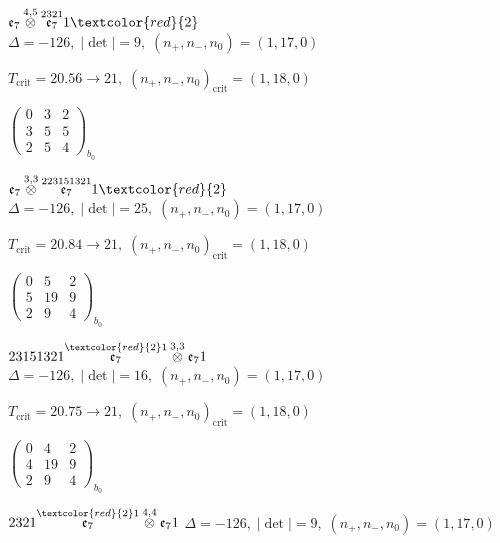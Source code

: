\documentclass[10pt]{article}
\begin{document}
$\mathfrak{e}_7\overset{4,5}{\otimes}\overset{2321}{\mathfrak{e}_7}1\textcolor{red}{2}$ \quad $\Delta=-126,\; |\det|=9,\; (n_+,n_-,n_0)=(1,17,0)$

\hspace{1em}$T_{\text{crit}}=20.56 \to 21,\; (n_+,n_-,n_0)_{\text{crit}}=(1,18,0)$

\hspace{2em}$\left(\begin{smallmatrix}0 & 3 & 2 \\ 3 & 5 & 5 \\ 2 & 5 & 4\end{smallmatrix}\right)_{\!b_0}$

\smallskip

$\mathfrak{e}_7\overset{3,3}{\otimes}\overset{223151321}{\mathfrak{e}_7}1\textcolor{red}{2}$ \quad $\Delta=-126,\; |\det|=25,\; (n_+,n_-,n_0)=(1,17,0)$

\hspace{1em}$T_{\text{crit}}=20.84 \to 21,\; (n_+,n_-,n_0)_{\text{crit}}=(1,18,0)$

\hspace{2em}$\left(\begin{smallmatrix}0 & 5 & 2 \\ 5 & 19 & 9 \\ 2 & 9 & 4\end{smallmatrix}\right)_{\!b_0}$

\smallskip

$23151321\overset{\textcolor{red}{2}1}{\mathfrak{e}_7}\overset{3,3}{\otimes}\mathfrak{e}_71$ \quad $\Delta=-126,\; |\det|=16,\; (n_+,n_-,n_0)=(1,17,0)$

\hspace{1em}$T_{\text{crit}}=20.75 \to 21,\; (n_+,n_-,n_0)_{\text{crit}}=(1,18,0)$

\hspace{2em}$\left(\begin{smallmatrix}0 & 4 & 2 \\ 4 & 19 & 9 \\ 2 & 9 & 4\end{smallmatrix}\right)_{\!b_0}$

\smallskip

$2321\overset{\textcolor{red}{2}1}{\mathfrak{e}_7}\overset{4,4}{\otimes}\mathfrak{e}_71$ \quad $\Delta=-126,\; |\det|=9,\; (n_+,n_-,n_0)=(1,17,0)$
\end{document}
